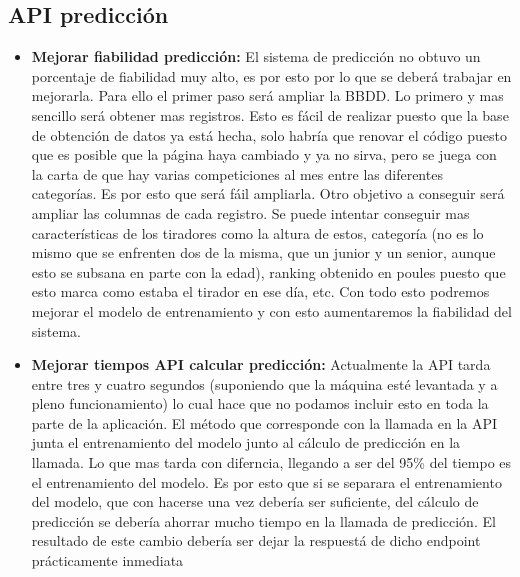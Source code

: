 \subsection{API predicción}
\begin{itemize}
  \item \textbf{Mejorar fiabilidad predicción:} El sistema de predicción no obtuvo un
    porcentaje de fiabilidad muy alto, es por esto por lo que se deberá trabajar
    en mejorarla. Para ello el primer paso será ampliar la \acs{BBDD}. Lo primero y mas sencillo
    será obtener mas registros. Esto es fácil de realizar puesto que la base de obtención
    de datos ya está hecha, solo habría que renovar el código puesto que es posible
    que la página haya cambiado y ya no sirva, pero se juega con la carta de que
    hay varias competiciones al mes entre las diferentes categorías. Es por esto
    que será fáil ampliarla. Otro objetivo a conseguir será ampliar las columnas
    de cada registro. Se puede intentar conseguir mas características de los tiradores
    como la altura de estos, categoría (no es lo mismo que se enfrenten dos de la misma,
    que un junior y un senior, aunque esto se subsana en parte con la edad), ranking
    obtenido en poules puesto que esto marca como estaba el tirador en ese día, etc.
    Con todo esto podremos mejorar el modelo de entrenamiento y con esto aumentaremos
    la fiabilidad del sistema.

  \item \textbf{Mejorar tiempos API calcular predicción:} Actualmente la API tarda entre
    tres y cuatro segundos (suponiendo que la máquina esté levantada y a pleno funcionamiento)
    lo cual hace que no podamos incluir esto en toda la parte de la aplicación. El método
    que corresponde con la llamada en la API junta el entrenamiento del modelo junto
    al cálculo de predicción en la llamada. Lo que mas tarda con diferncia, llegando a ser
    del 95\% del tiempo es el entrenamiento del modelo. Es por esto que si se separara
    el entrenamiento del modelo, que con hacerse una vez debería ser suficiente, del
    cálculo de predicción se debería ahorrar mucho tiempo en la llamada de predicción.
    El resultado de este cambio debería ser dejar la respuestá de dicho endpoint prácticamente
    inmediata
\end{itemize}

